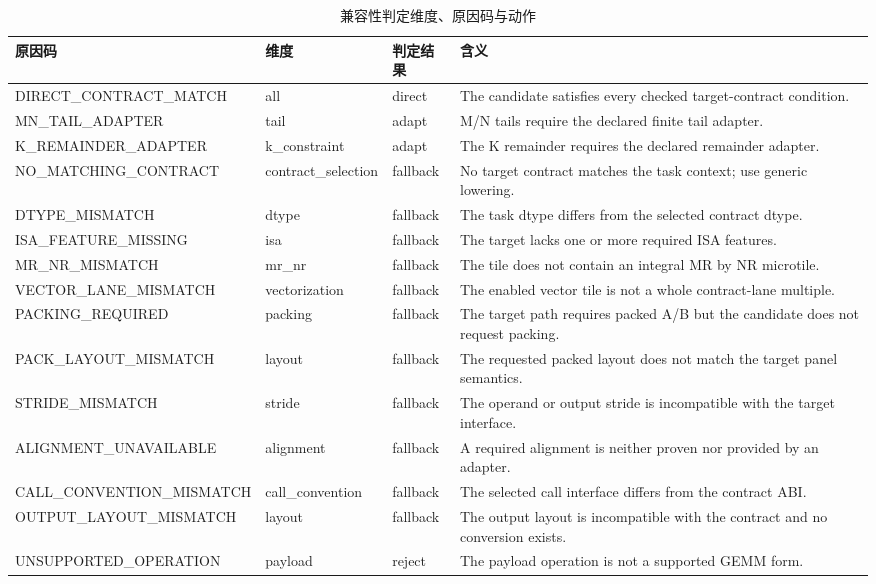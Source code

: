 \begin{table}[htbp]
  \centering
  \caption{兼容性判定维度、原因码与动作}
  \label{tab:chapter4-reasons}
  \begin{tabular}{p{}p{}p{}p{}}
    \toprule
    原因码 & 维度 & 判定结果 & 含义 \\
    \midrule
    DIRECT\_CONTRACT\_MATCH & all & direct & The candidate satisfies every checked target-contract condition. \\
    MN\_TAIL\_ADAPTER & tail & adapt & M/N tails require the declared finite tail adapter. \\
    K\_REMAINDER\_ADAPTER & k\_constraint & adapt & The K remainder requires the declared remainder adapter. \\
    NO\_MATCHING\_CONTRACT & contract\_selection & fallback & No target contract matches the task context; use generic lowering. \\
    DTYPE\_MISMATCH & dtype & fallback & The task dtype differs from the selected contract dtype. \\
    ISA\_FEATURE\_MISSING & isa & fallback & The target lacks one or more required ISA features. \\
    MR\_NR\_MISMATCH & mr\_nr & fallback & The tile does not contain an integral MR by NR microtile. \\
    VECTOR\_LANE\_MISMATCH & vectorization & fallback & The enabled vector tile is not a whole contract-lane multiple. \\
    PACKING\_REQUIRED & packing & fallback & The target path requires packed A/B but the candidate does not request packing. \\
    PACK\_LAYOUT\_MISMATCH & layout & fallback & The requested packed layout does not match the target panel semantics. \\
    STRIDE\_MISMATCH & stride & fallback & The operand or output stride is incompatible with the target interface. \\
    ALIGNMENT\_UNAVAILABLE & alignment & fallback & A required alignment is neither proven nor provided by an adapter. \\
    CALL\_CONVENTION\_MISMATCH & call\_convention & fallback & The selected call interface differs from the contract ABI. \\
    OUTPUT\_LAYOUT\_MISMATCH & layout & fallback & The output layout is incompatible with the contract and no conversion exists. \\
    UNSUPPORTED\_OPERATION & payload & reject & The payload operation is not a supported GEMM form. \\

\end{tabular}
\end{table}
